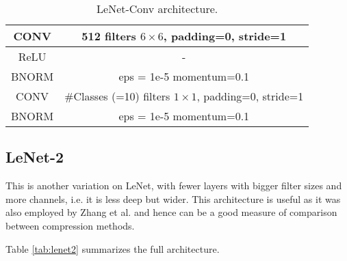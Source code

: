 \begin{table}[]
\begin{tabular}{|c|c|}
\rowcolor[HTML]{CBCEFB} 
CONV           & 512 filters $6 \times 6$, padding=0, stride=1             \\ \hline
ReLU           & -                                                         \\ \hline
\rowcolor[HTML]{C3EDF8} 
BNORM          & eps = 1e-5 momentum=0.1                                   \\ \hline
\rowcolor[HTML]{CBCEFB} 
CONV           & \#Classes (=10) filters $1 \times 1$, padding=0, stride=1 \\ \hline
\rowcolor[HTML]{C3EDF8} 
BNORM          & eps = 1e-5 momentum=0.1                                   \\ \hline
\end{tabular}
\caption{LeNet-Conv architecture. }
\label{tab:lenet-conv}
\end{table}



\subsection{LeNet-2}
This is another variation on LeNet, with fewer layers with bigger filter sizes and more channels, i.e. it is less deep but wider. This architecture is useful as it was also employed by Zhang et al. \parencite{zhang2015SVD} and hence can be a good measure of comparison between compression methods. 

Table \ref{tab:lenet2} summarizes the full architecture. 

